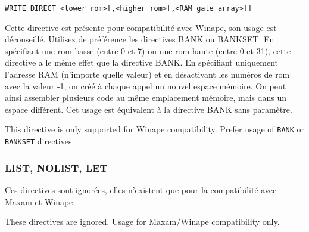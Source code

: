 \begin{verbatim}
WRITE DIRECT <lower rom>[,<higher rom>[,<RAM gate array>]]
\end{verbatim}

\begin{xfr}
Cette directive est présente pour compatibilité avec Winape, son usage est déconseillé. Utilisez de préférence les directives BANK ou BANKSET.
En spécifiant une rom basse (entre 0 et 7) ou une rom haute (entre 0 et 31), cette directive a le même effet que la directive BANK.
En spécifiant uniquement l'adresse RAM (n'importe quelle valeur) et en désactivant les numéros de rom avec la valeur -1, on créé à chaque appel un nouvel espace mémoire. On peut ainsi assembler plusieurs code au même emplacement mémoire, mais dans un espace différent. Cet usage est équivalent à la directive BANK sans paramètre.

\end{xfr}

\begin{xen}
This directive is only supported for Winape compatibility. Prefer usage of \texttt{BANK} or \texttt{BANKSET} directives.

\end{xen}


\subsubsection{LIST, NOLIST, LET}

\begin{xfr}
Ces directives sont ignorées, elles n'existent que pour la compatibilité avec Maxam et Winape.
\end{xfr}

\begin{xen}
These directives are ignored. Usage for Maxam/Winape compatibility only.
\end{xen}
